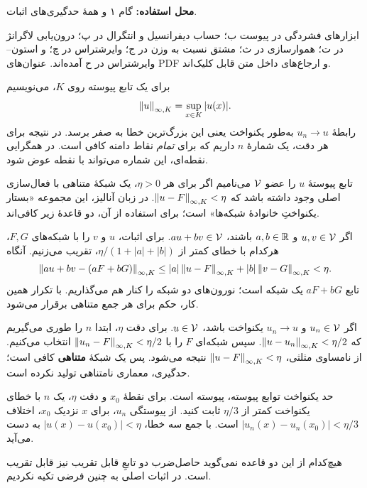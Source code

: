 \clearpage
{}
\label{app:approx}
\textbf{محل استفاده:} گام ۱ و همهٔ حدگیری‌های اثبات.

ابزارهای فشردگی در پیوست ب؛ حساب دیفرانسیل و انتگرال در پ؛ درون‌یابی لاگرانژ در ت؛ هموارسازی در ث؛ مشتق نسبت به وزن در ج؛ وایرشتراس در چ؛ و استون–وایرشتراس در ح آمده‌اند. عنوان‌های PDF و ارجاع‌های داخل متن قابل کلیک‌اند.

برای یک تابع پیوسته روی $K$، می‌نویسیم
\[
\left\lVert u\right\rVert_{\infty,K}=\sup_{x\in K}|u(x)|.
\]
رابطهٔ $u_n\to u$ به‌طور یکنواخت یعنی این بزرگ‌ترین خطا به صفر برسد. در نتیجه برای هر دقت، یک شمارهٔ $n$ داریم که برای \emph{تمام} نقاط دامنه کافی است. در همگرایی نقطه‌ای، این شماره می‌تواند با نقطه عوض شود.

تابع پیوستهٔ $u$ را عضو $\mathcal V$ می‌نامیم اگر برای هر $\eta>0$، یک شبکهٔ متناهی با فعال‌سازی اصلی وجود داشته باشد که $\left\lVert u-F\right\rVert_{\infty,K}<\eta$. در زبان آنالیز، این مجموعه «بستار یکنواختِ خانوادهٔ شبکه‌ها» است؛ برای استفاده از آن، دو قاعدهٔ زیر کافی‌اند.

اگر $u,v\in\mathcal V$ و $a,b\in\mathbb R$ باشند، $au+bv\in\mathcal V$. برای اثبات، $u$ و $v$ را با شبکه‌های $F,G$، هرکدام با خطای کمتر از $\eta/(1+|a|+|b|)$، تقریب می‌زنیم. آنگاه
\[
\left\lVert au+bv-(aF+bG)\right\rVert_{\infty,K}
\leq |a|\left\lVert u-F\right\rVert_{\infty,K}+|b|\left\lVert v-G\right\rVert_{\infty,K}<\eta.
\]
تابع $aF+bG$ یک شبکه است؛ نورون‌های دو شبکه را کنار هم می‌گذاریم. با تکرار همین کار، حکم برای هر جمع متناهی برقرار می‌شود.

اگر $u_n\in\mathcal V$ و $u_n\to u$ یکنواخت باشد، $u\in\mathcal V$. برای دقت $\eta$، ابتدا $n$ را طوری می‌گیریم که $\left\lVert u-u_n\right\rVert_{\infty,K}<\eta/2$. سپس شبکه‌ای $F$ را با $\left\lVert u_n-F\right\rVert_{\infty,K}<\eta/2$ انتخاب می‌کنیم. از نامساوی مثلثی، $\left\lVert u-F\right\rVert_{\infty,K}<\eta$ نتیجه می‌شود. پس یک شبکهٔ \textbf{متناهی} کافی است؛ حدگیری، معماری نامتناهی تولید نکرده است.

حد یکنواخت توابع پیوسته، پیوسته است. برای نقطهٔ $x_0$ و دقت $\eta$، یک $n$ با خطای یکنواخت کمتر از $\eta/3$ ثابت کنید. از پیوستگی $u_n$، برای $x$ نزدیک $x_0$، اختلاف $|u_n(x)-u_n(x_0)|<\eta/3$ است. با جمع سه خطا، $|u(x)-u(x_0)|<\eta$ به دست می‌آید.

\begin{intuition}
هیچ‌کدام از این دو قاعده نمی‌گوید حاصل‌ضرب دو تابعِ قابل تقریب نیز قابل تقریب است. در اثبات اصلی به چنین فرضی تکیه نکردیم.
\end{intuition}

